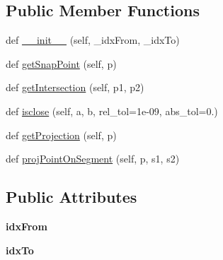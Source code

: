 \subsection*{Public Member Functions}
\begin{DoxyCompactItemize}
\item 
def \mbox{\hyperlink{class_dsg_tools_1_1_dsg_geometry_snapper_1_1segment_snap_item_1_1_segment_snap_item_a568727b93aeae0ebcb34fe941661b8eb}{\+\_\+\+\_\+init\+\_\+\+\_\+}} (self, \+\_\+idx\+From, \+\_\+idx\+To)
\item 
def \mbox{\hyperlink{class_dsg_tools_1_1_dsg_geometry_snapper_1_1segment_snap_item_1_1_segment_snap_item_af26f4b0baf4ca7e54fa60fc788810157}{get\+Snap\+Point}} (self, p)
\item 
def \mbox{\hyperlink{class_dsg_tools_1_1_dsg_geometry_snapper_1_1segment_snap_item_1_1_segment_snap_item_ab51e13ca6ee39f14f6b00f7af423d5b3}{get\+Intersection}} (self, p1, p2)
\item 
def \mbox{\hyperlink{class_dsg_tools_1_1_dsg_geometry_snapper_1_1segment_snap_item_1_1_segment_snap_item_a8b8442aedb680465b830ad45dff65aa2}{isclose}} (self, a, b, rel\+\_\+tol=1e-\/09, abs\+\_\+tol=0.)
\item 
def \mbox{\hyperlink{class_dsg_tools_1_1_dsg_geometry_snapper_1_1segment_snap_item_1_1_segment_snap_item_aa67a79b6ae9838d3165fab4dc442ed73}{get\+Projection}} (self, p)
\item 
def \mbox{\hyperlink{class_dsg_tools_1_1_dsg_geometry_snapper_1_1segment_snap_item_1_1_segment_snap_item_a0e1482462bb375b0e1c63b63353ecaee}{proj\+Point\+On\+Segment}} (self, p, s1, s2)
\end{DoxyCompactItemize}
\subsection*{Public Attributes}
\begin{DoxyCompactItemize}
\item 
\mbox{\label{class_dsg_tools_1_1_dsg_geometry_snapper_1_1segment_snap_item_1_1_segment_snap_item_a074fb4c643254ccb49c5f67a7dad37fa}} 
{\bfseries idx\+From}
\item 
\mbox{\label{class_dsg_tools_1_1_dsg_geometry_snapper_1_1segment_snap_item_1_1_segment_snap_item_af6d28e0a902606d1887c62ca063667f1}} 
{\bfseries idx\+To}
\end{DoxyCompactItemize}


